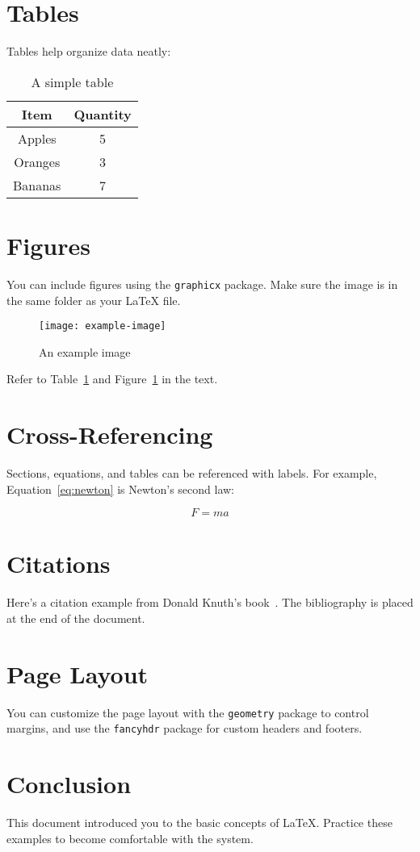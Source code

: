 \documentclass[a4paper, 12pt]{article}
\begin{document}
\section{Tables}
Tables help organize data neatly:
\begin{table}[h]
    \centering
    \begin{tabular}{|c|c|}
    \hline
    Item & Quantity \\ \hline
    Apples & 5 \\ 
    Oranges & 3 \\ 
    Bananas & 7 \\ \hline
    \end{tabular}
    \caption{A simple table}
    \label{tab:fruit}
\end{table}

\section{Figures}
You can include figures using the \texttt{graphicx} package. Make sure the image is in the same folder as your LaTeX file.

\begin{figure}[h]
    \centering
    \texttt{[image: example-image]} %
    \caption{An example image}
    \label{fig:image}
\end{figure}

Refer to Table~\ref{tab:fruit} and Figure~\ref{fig:image} in the text.

\section{Cross-Referencing}
Sections, equations, and tables can be referenced with labels. For example, Equation~\ref{eq:newton} is Newton's second law:

\begin{equation}
F = ma
\label{eq:newton}
\end{equation}

\section{Citations}
Here’s a citation example from Donald Knuth's book~\cite{knuth1984}. The bibliography is placed at the end of the document.

\section{Page Layout}
You can customize the page layout with the \texttt{geometry} package to control margins, and use the \texttt{fancyhdr} package for custom headers and footers.

\section{Conclusion}
This document introduced you to the basic concepts of LaTeX. Practice these examples to become comfortable with the system.

\newpage


\end{document}
